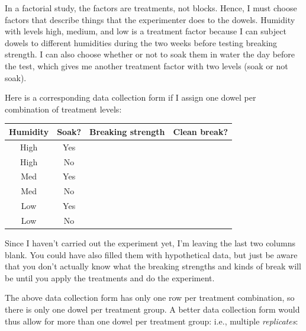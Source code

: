 \documentclass{article}\usepackage{graphicx, color}
\providecommand{\q}{$\quad$ \newline}
\numberwithin{equation}{section}
\begin{document}
\begin{flushleft}
\begin{enumerate}[1. ]
\color{red}

In a factorial study, the factors are treatments, not blocks. Hence, I must choose factors that describe things that the experimenter does to the dowels. Humidity with levels high, medium, and low is a treatment factor because I can subject dowels to different humidities during the two weeks before testing breaking strength. I can also choose whether or not to soak them in water the day before the test, which gives me another treatment factor with two levels (soak or not soak). \q

Here is a corresponding data collection form if I assign one dowel per combination of treatment levels:

\begin{center}
\begin{tabular}{cccc}
Humidity & Soak? & Breaking strength & Clean break? \\ \hline
High & Yes &  &  \\ 
High & No &  &  \\ 
Med & Yes &  &  \\ 
Med & No &  &  \\ 
Low & Yes &  &  \\ 
Low & No &  &  \\ 
\end{tabular}
\end{center}

Since I haven't carried out the experiment yet, I'm leaving the last two columns blank. You could have also filled them with hypothetical data, but just be aware that you don't actually know what the breaking strengths and kinds of break will be until you apply the treatments and do the experiment. \q

The above data collection form has only one row per treatment combination, so there is only one dowel per treatment group. A better data collection form would thus allow for more than one dowel per treatment group: i.e., multiple \emph{replicates}:


\end{enumerate}
\end{flushleft}
\end{document}

